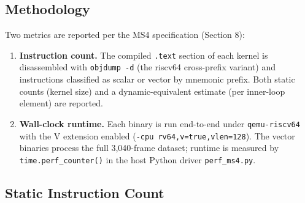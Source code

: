 \documentclass[11pt,a4paper]{article}
\begin{document}
\subsection{Methodology}

Two metrics are reported per the MS4 specification (Section 8):

\begin{enumerate}
    \item \textbf{Instruction count.} The compiled \texttt{.text} section
          of each kernel is disassembled with \texttt{objdump -d} (the
          riscv64 cross-prefix variant) and instructions classified as
          scalar or vector by mnemonic prefix. Both static counts (kernel
          size) and a dynamic-equivalent estimate (per inner-loop element)
          are reported.
    \item \textbf{Wall-clock runtime.} Each binary is run end-to-end under
          \texttt{qemu-riscv64} with the V extension enabled
          (\texttt{-cpu rv64,v=true,vlen=128}). The vector binaries process
          the full 3{,}040-frame dataset; runtime is measured by
          \texttt{time.perf\_counter()} in the host Python driver
          \texttt{perf\_ms4.py}.
\end{enumerate}

\subsection{Static Instruction Count}
\end{document}
